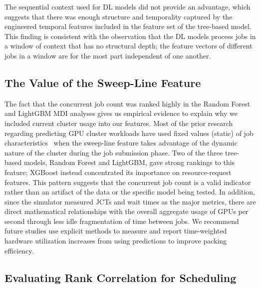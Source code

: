 The sequential context used for DL models did not provide an advantage, which suggests that there was enough structure and temporality captured by the engineered temporal features included in the feature set of the tree-based model. This finding is consistent with the observation that the DL models process jobs in a window of context that has no structural depth; the feature vectors of different jobs in a window are for the most part independent of one another.

\subsection{The Value of the Sweep-Line Feature}

The fact that the concurrent job count was ranked highly in the Random Forest and LightGBM MDI analyses gives us empirical evidence to explain why we included current cluster usage into our features. Most of the prior research regarding predicting GPU cluster workloads have used fixed values (static) of job characteristics~\cite{cortez2017resource} when the sweep-line feature takes advantage of the dynamic nature of the cluster during the job submission phase. Two of the three tree-based models, Random Forest and LightGBM, gave strong rankings to this feature; XGBoost instead concentrated its importance on resource-request features. This pattern suggests that the concurrent job count is a valid indicator rather than an artifact of the data or the specific model being tested. In addition, since the simulator measured JCTs and wait times as the major metrics, there are direct mathematical relationships with the overall aggregate usage of GPUs per second through less idle fragmentation of time between jobs. We recommend future studies use explicit methods to measure and report time-weighted hardware utilization increases from using predictions to improve packing efficiency.

\subsection{Evaluating Rank Correlation for Scheduling}


